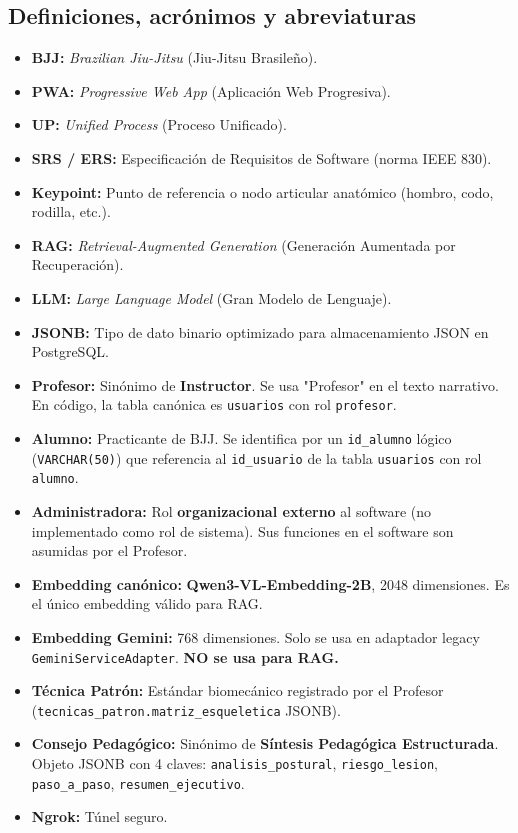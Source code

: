 \subsection{Definiciones, acrónimos y abreviaturas}
\begin{itemize}
    \item \textbf{BJJ:} \textit{Brazilian Jiu-Jitsu} (Jiu-Jitsu Brasileño).
    \item \textbf{PWA:} \textit{Progressive Web App} (Aplicación Web Progresiva).
    \item \textbf{UP:} \textit{Unified Process} (Proceso Unificado).
    \item \textbf{SRS / ERS:} Especificación de Requisitos de Software (norma IEEE 830).
    \item \textbf{Keypoint:} Punto de referencia o nodo articular anatómico (hombro, codo, rodilla, etc.).
    \item \textbf{RAG:} \textit{Retrieval-Augmented Generation} (Generación Aumentada por Recuperación).
    \item \textbf{LLM:} \textit{Large Language Model} (Gran Modelo de Lenguaje).
    \item \textbf{JSONB:} Tipo de dato binario optimizado para almacenamiento JSON en PostgreSQL.
    \item \textbf{Profesor:} Sinónimo de \textbf{Instructor}. Se usa "Profesor" en el texto narrativo. En código, la tabla canónica es \texttt{usuarios} con rol \texttt{profesor}.
    \item \textbf{Alumno:} Practicante de BJJ. Se identifica por un \texttt{id\_alumno} lógico (\texttt{VARCHAR(50)}) que referencia al \texttt{id\_usuario} de la tabla \texttt{usuarios} con rol \texttt{alumno}.
    \item \textbf{Administradora:} Rol \textbf{organizacional externo} al software (no implementado como rol de sistema). Sus funciones en el software son asumidas por el Profesor.
    \item \textbf{Embedding canónico:} \textbf{Qwen3-VL-Embedding-2B}, 2048 dimensiones. Es el único embedding válido para RAG.
    \item \textbf{Embedding Gemini:} 768 dimensiones. Solo se usa en adaptador legacy \texttt{GeminiServiceAdapter}. \textbf{NO se usa para RAG.}
    \item \textbf{Técnica Patrón:} Estándar biomecánico registrado por el Profesor (\texttt{tecnicas\_patron.matriz\_esqueletica} JSONB).
    \item \textbf{Consejo Pedagógico:} Sinónimo de \textbf{Síntesis Pedagógica Estructurada}. Objeto JSONB con 4 claves: \texttt{analisis\_postural}, \texttt{riesgo\_lesion}, \texttt{paso\_a\_paso}, \texttt{resumen\_ejecutivo}.
    \item \textbf{Ngrok:} Túnel seguro.
\end{itemize}


